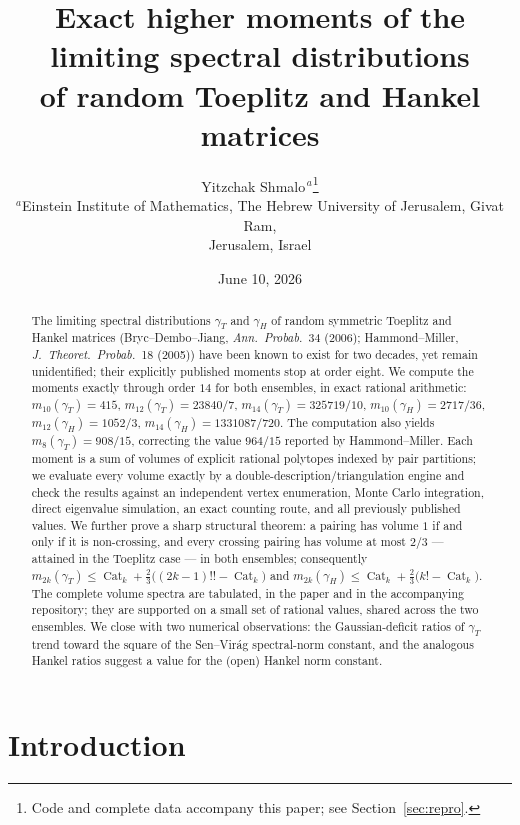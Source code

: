﻿\documentclass[11pt]{article}
\title{Exact higher moments of the limiting spectral distributions\\
of random Toeplitz and Hankel matrices}
\author{Yitzchak Shmalo$^{\,a}$\thanks{
Code and complete data
accompany this paper; see Section~\ref{sec:repro}.}\\[2pt]
{\small $^{a}$Einstein Institute of Mathematics, The Hebrew University of
Jerusalem, Givat Ram,}\\[-2pt]
{\small Jerusalem, Israel}}
\date{June 10, 2026}
\theoremstyle{remark}
\newcommand{\Cat}{\operatorname{Cat}}
\newcommand{\gT}{\gamma_T}
\newcommand{\gH}{\gamma_H}
\begin{document}
\maketitle

\begin{abstract}
The limiting spectral distributions $\gT$ and $\gH$ of random symmetric Toeplitz and
Hankel matrices (Bryc--Dembo--Jiang, \emph{Ann.\ Probab.}\ 34 (2006); Hammond--Miller,
\emph{J.\ Theoret.\ Probab.}\ 18 (2005)) have been known to exist for two decades, yet
remain unidentified; their explicitly published moments stop at order eight. We compute
the moments exactly through order $14$ for both ensembles, in exact rational
arithmetic:
$m_{10}(\gT)=415$, $m_{12}(\gT)=23840/7$, $m_{14}(\gT)=325719/10$,
$m_{10}(\gH)=2717/36$, $m_{12}(\gH)=1052/3$, $m_{14}(\gH)=1331087/720$. The
computation also yields $m_8(\gT)=908/15$, correcting the value $964/15$ reported by
Hammond--Miller. Each moment is a sum of
volumes of explicit rational polytopes indexed by pair partitions; we evaluate every
volume exactly by a double-description/triangulation engine and check the results
against an independent vertex enumeration, Monte Carlo integration, direct eigenvalue
simulation, an exact counting route, and all previously published values.
We further prove a sharp structural theorem: a pairing has volume $1$ if and only if
it is non-crossing, and every crossing pairing has volume at most $2/3$ --- attained
in the Toeplitz case --- in both ensembles; consequently
$m_{2k}(\gT)\le \Cat_k+\tfrac23\big((2k-1)!!-\Cat_k\big)$ and
$m_{2k}(\gH)\le \Cat_k+\tfrac23\big(k!-\Cat_k\big)$. The complete volume spectra are
tabulated, in the paper and in the accompanying repository; they are supported on a
small set of rational values, shared across the two ensembles. We close with two numerical observations: the Gaussian-deficit ratios of
$\gT$ trend toward the square of the Sen--Vir\'ag spectral-norm constant, and the
analogous Hankel ratios suggest a value for the (open) Hankel norm constant.
\end{abstract}

\section{Introduction}
\end{document}
